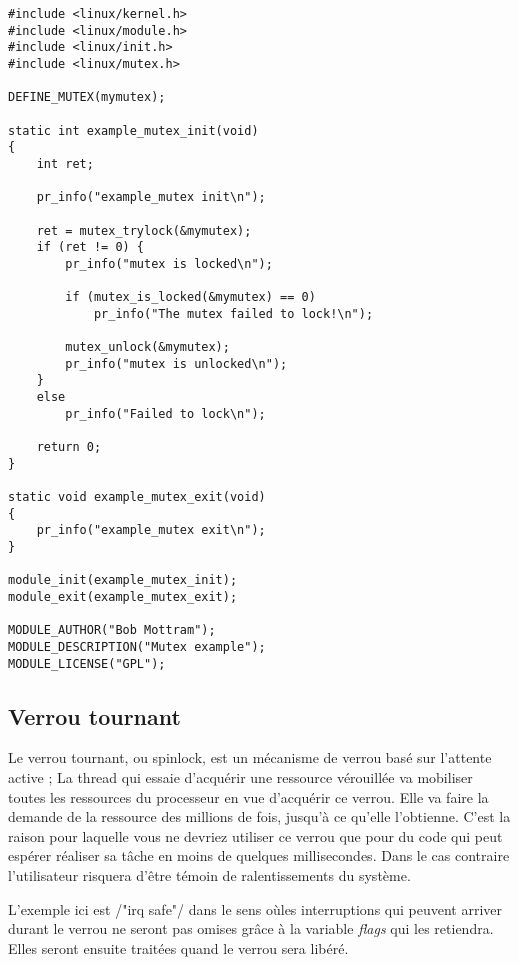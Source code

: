 \documentclass[11pt]{article}
\begin{document}
\begin{verbatim}
#include <linux/kernel.h>
#include <linux/module.h>
#include <linux/init.h>
#include <linux/mutex.h>

DEFINE_MUTEX(mymutex);

static int example_mutex_init(void)
{
    int ret;

    pr_info("example_mutex init\n");

    ret = mutex_trylock(&mymutex);
    if (ret != 0) {
        pr_info("mutex is locked\n");

        if (mutex_is_locked(&mymutex) == 0)
            pr_info("The mutex failed to lock!\n");

        mutex_unlock(&mymutex);
        pr_info("mutex is unlocked\n");
    }
    else
        pr_info("Failed to lock\n");

    return 0;
}

static void example_mutex_exit(void)
{
    pr_info("example_mutex exit\n");
}

module_init(example_mutex_init);
module_exit(example_mutex_exit);

MODULE_AUTHOR("Bob Mottram");
MODULE_DESCRIPTION("Mutex example");
MODULE_LICENSE("GPL");
\end{verbatim}

\subsection*{Verrou tournant}
\label{sec-12-2}

Le verrou tournant, ou spinlock, est un mécanisme de verrou basé sur l'attente active ; La thread qui essaie d'acquérir une ressource vérouillée va mobiliser toutes les ressources du processeur en vue d'acquérir ce verrou. Elle va faire la demande de la ressource des millions de fois, jusqu'à ce qu'elle l'obtienne. C'est la raison pour laquelle vous ne devriez utiliser ce verrou que pour du code qui peut espérer réaliser sa tâche en moins de quelques millisecondes. Dans le cas contraire l'utilisateur risquera d'être témoin de ralentissements du système.

L'exemple ici est /"irq safe"/ dans le sens oùles interruptions qui peuvent arriver durant le verrou ne seront pas omises grâce à la variable \emph{flags} qui les retiendra. Elles seront ensuite traitées quand le verrou sera libéré.
\end{document}
